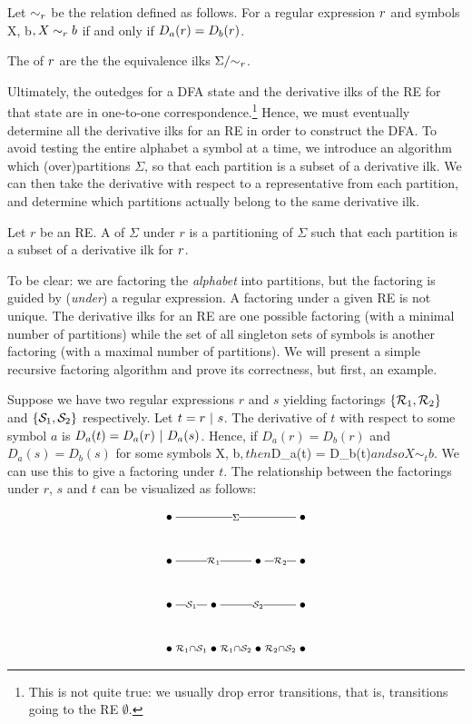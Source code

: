 Let $\sim_r$ be the relation defined as follows.  For a regular expression $r$ and symbols X, b$, X \sim_r b$ if and only if $D_a (r) = D_b (r)$.

\begin{definition}
The  of $r$ are the the equivalence ilks $\Sigma/{\sim_r}$.
\end{definition}

Ultimately, the outedges for a DFA state and the derivative ilks of the RE for that state are in one-to-one correspondence.\footnote{This is not quite true: we usually drop error transitions, that is, transitions going to the RE $\emptyset$.}   Hence, we must eventually determine all the derivative ilks for an RE in order to construct the DFA.  To avoid testing the entire alphabet a symbol at a time, we introduce an algorithm which (over)partitions $\Sigma$, so that each partition is a subset of a derivative ilk.   We can then take the derivative with respect to a representative from each partition, and determine which partitions actually belong to the same derivative ilk.

\begin{definition}
Let $r$ be an RE.  A  of $\Sigma$ under $r$ is a partitioning of $\Sigma$ such that each partition is a subset of a derivative ilk for $r$.
\end{definition}

To be clear: we are factoring the \emph{alphabet} into partitions, but the factoring is guided by (\emph{under}) a regular expression.  A factoring under a given RE is not unique.  The derivative ilks for an RE are one possible factoring (with a minimal number of partitions) while the set of all singleton sets of symbols is another factoring (with a maximal number of partitions).  We will present a simple recursive factoring algorithm and prove its correctness, but first, an example.

Suppose we have two regular expressions $r$ and $s$ yielding factorings $\{ \mathcal{R}_1, \mathcal{R}_2 \}$ and $\{ \mathcal{S}_1, \mathcal{S}_2 \}$ respectively.  Let $t = r \ | \  s$.  The derivative of $t$ with respect to some symbol $a$ is $D_a(t) = D_a(r) \ | \  D_a(s)$.  Hence, if $D_a(r) = D_b(r)$ and $D_a(s) = D_b(s)$ for some symbols X, b$, then $D_a(t) = D_b(t)$ and so X \sim_t b$.  We can use this to give a factoring under $t$.  The relationship between the factorings under $r$, $s$ and $t$ can be visualized as follows:

\[
  \xymatrix{
    \bullet \ar@{-}[rrr]|{\Sigma} &&& \bullet \\
    \bullet \ar@{-}[rr]|{\CR_1} && \bullet \ar@{-}[r]|{\CR_2} & \bullet \\
    \bullet \ar@{-}[r]|{\CS_1} & \bullet \ar@{-}[rr]|{\CS_2} &&  \bullet \\
    \bullet \ar@{-}[r]|{\CR_1 \cap \CS_1} & 
    \bullet \ar@{-}[r]|{\CR_1 \cap \CS_2} & 
    \bullet \ar@{-}[r]|{\CR_2 \cap \CS_2} &
    \bullet
  }
\]

